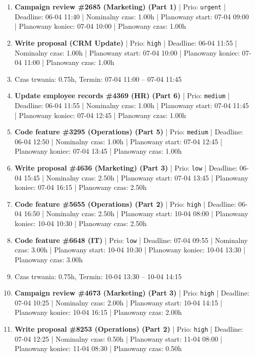 {\begin{enumerate}
  \item [\textbf{14607}] \textbf{Campaign review \#2685 (Marketing) (Part 1)} | Prio: \texttt{urgent} | Deadline: 06-04 11:40 | Nominalny czas: 1.00h | Planowany start: 07-04 09:00 | Planowany koniec: 07-04 10:00 | Planowany czas: 1.00h
  \item [\textbf{14629}] \textbf{Write proposal (CRM Update)} | Prio: \texttt{high} | Deadline: 06-04 11:55 | Nominalny czas: 1.00h | Planowany start: 07-04 10:00 | Planowany koniec: 07-04 11:00 | Planowany czas: 1.00h
  \item [\textbf{PRZERWA}] Czas trwania: 0.75h, Termin: 07-04 11:00 -- 07-04 11:45
  \item [\textbf{14658}] \textbf{Update employee records \#4369 (HR) (Part 6)} | Prio: \texttt{medium} | Deadline: 06-04 11:55 | Nominalny czas: 1.00h | Planowany start: 07-04 11:45 | Planowany koniec: 07-04 12:45 | Planowany czas: 1.00h
  \item [\textbf{14645}] \textbf{Code feature \#3295 (Operations) (Part 5)} | Prio: \texttt{medium} | Deadline: 06-04 12:50 | Nominalny czas: 1.00h | Planowany start: 07-04 12:45 | Planowany koniec: 07-04 13:45 | Planowany czas: 1.00h
  \item [\textbf{14684}] \textbf{Write proposal \#4636 (Marketing) (Part 3)} | Prio: \texttt{low} | Deadline: 06-04 15:45 | Nominalny czas: 2.50h | Planowany start: 07-04 13:45 | Planowany koniec: 07-04 16:15 | Planowany czas: 2.50h
  \item [\textbf{14626}] \textbf{Code feature \#5655 (Operations) (Part 2)} | Prio: \texttt{high} | Deadline: 06-04 16:50 | Nominalny czas: 2.50h | Planowany start: 10-04 08:00 | Planowany koniec: 10-04 10:30 | Planowany czas: 2.50h
  \item [\textbf{14683}] \textbf{Code feature \#6648 (IT)} | Prio: \texttt{low} | Deadline: 07-04 09:55 | Nominalny czas: 3.00h | Planowany start: 10-04 10:30 | Planowany koniec: 10-04 13:30 | Planowany czas: 3.00h
  \item [\textbf{PRZERWA}] Czas trwania: 0.75h, Termin: 10-04 13:30 -- 10-04 14:15
  \item [\textbf{14625}] \textbf{Campaign review \#4673 (Marketing) (Part 3)} | Prio: \texttt{high} | Deadline: 07-04 10:25 | Nominalny czas: 2.00h | Planowany start: 10-04 14:15 | Planowany koniec: 10-04 16:15 | Planowany czas: 2.00h
  \item [\textbf{14614}] \textbf{Write proposal \#8253 (Operations) (Part 2)} | Prio: \texttt{high} | Deadline: 07-04 12:25 | Nominalny czas: 0.50h | Planowany start: 11-04 08:00 | Planowany koniec: 11-04 08:30 | Planowany czas: 0.50h

\end{enumerate}}
